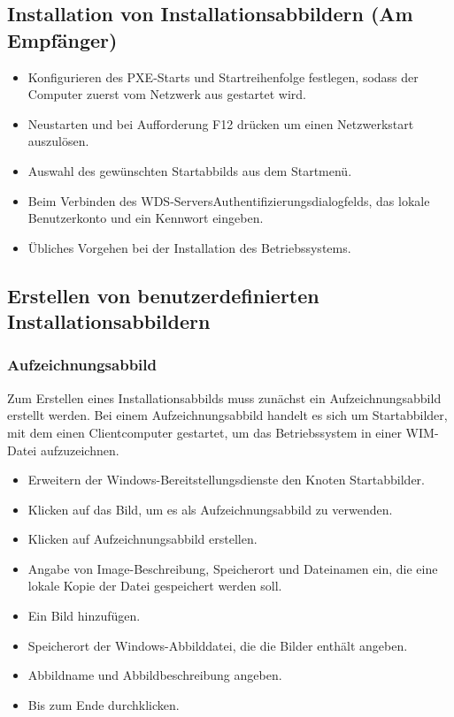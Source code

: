 \documentclass[a4paper,11pt]{article}
\begin{document}
\subsection{Installation von Installationsabbildern (Am Empf\"anger)}
\begin{itemize}
 \item Konfigurieren des PXE-Starts und Startreihenfolge festlegen, sodass der Computer zuerst vom Netzwerk aus gestartet wird.
 \item Neustarten und bei Aufforderung F12 dr\"ucken um einen Netzwerkstart auszulösen.
 \item Auswahl des gewünschten Startabbilds aus dem Startmenü.
 \item Beim Verbinden des WDS-ServersAuthentifizierungsdialogfelds, das lokale Benutzerkonto und ein Kennwort eingeben.
 \item \"Ubliches Vorgehen bei der Installation des Betriebssystems.
\end{itemize}

\subsection{Erstellen von benutzerdefinierten Installationsabbildern}
\subsubsection{Aufzeichnungsabbild}
Zum Erstellen eines Installationsabbilds muss zunächst ein Aufzeichnungsabbild erstellt werden. 
Bei einem Aufzeichnungsabbild handelt es sich um Startabbilder, mit dem einen Clientcomputer gestartet, um das Betriebssystem in einer WIM-Datei aufzuzeichnen.

\begin{itemize}
 \item Erweitern der Windows-Bereitstellungsdienste den Knoten Startabbilder.
 \item Klicken auf das Bild, um es als Aufzeichnungsabbild zu verwenden.
 \item Klicken auf Aufzeichnungsabbild erstellen.
 \item Angabe von Image-Beschreibung, Speicherort und Dateinamen ein, die eine lokale Kopie der Datei gespeichert werden soll.
 \item Ein Bild hinzufügen.
 \item Speicherort der Windows-Abbilddatei, die die Bilder enthält angeben.
 \item Abbildname und Abbildbeschreibung angeben.
 \item Bis zum Ende durchklicken.
\end{itemize}
\end{document}
